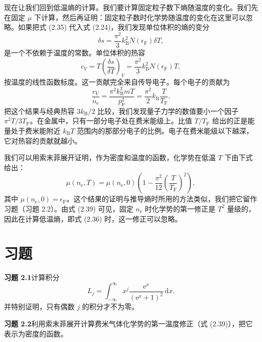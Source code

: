 现在让我们回到低温熵的计算。我们要计算固定粒子数下熵随温度的变化。我们先在固定 $\mu$ 下计算，然后再证明：固定粒子数时化学势随温度的变化在这里可以忽略。如果把式 (2.35) 代入式 (2.24)，我们发现单位体积的熵的变分
\begin{equation*}
\delta s=\frac{\pi^{2}}{3}k_{\mathrm{B}}^{2}N(\epsilon_{\mathrm{F}})\delta T,
\tag{2.36}
\end{equation*}
是一个不依赖于温度的常数。单位体积的热容
\begin{equation*}
c_{V}=T\left(\frac{\delta s}{\delta T}\right)_{V}=\frac{\pi^{2}}{3}k_{\mathrm{B}}^{2}N(\epsilon_{\mathrm{F}})T,
\tag{2.37}
\end{equation*}
按温度的线性函数标度。这一贡献完全来自传导电子。每个电子的贡献为
\begin{equation*}
\frac{c_{V}}{n_{\mathrm{e}}}=\frac{\pi^{2}k_{\mathrm{B}}^{2}mT}{p_{\mathrm{F}}^{2}}=\frac{\pi^{2}}{2}k_{\mathrm{B}}\frac{T}{T_{\mathrm{F}}}.
\tag{2.38}
\end{equation*}
把这个结果与经典热容 $3k_{\mathrm{B}}/2$ 比较，我们发现量子力学的数值要小一个因子 $\pi^{2}T/3T_{\mathrm{F}}$。在金属中，只有一部分电子处在费米能级上。比值 $T/T_{\mathrm{F}}$ 给出的正是能量处于费米能附近 $k_{\mathrm{B}}T$ 范围内的那部分电子的比例。电子在费米能级以下越深，它对热容的贡献就越小。

我们可以用索末菲展开证明，作为密度和温度的函数，化学势在低温 $T$ 下由下式给出：
\begin{equation*}
\mu(n_{\mathrm{e}},T)=\mu(n_{\mathrm{e}},0)\left(1-\frac{\pi^{2}}{12}\left(\frac{T}{T_{\mathrm{F}}}\right)^{2}\right),
\tag{2.39}
\end{equation*}
其中 $\mu(n_{\mathrm{e}},0)=\epsilon_{\mathrm{F}}$。这个结果的证明与推导熵时所用的方法类似，我们把它留作习题（习题 2.2）。由式 (2.39) 可见，固定 $n_{\mathrm{e}}$ 时化学势的第一修正是 $T^{2}$ 量级的，因此在计算低温熵，即式 (2.36) 时，这一修正可以忽略。

\section*{习题}

\textbf{习题 2.1}\quad 计算积分
\begin{equation*}
L_{j}=\int_{-\infty}^{\infty}x^{j}\frac{\mathrm{e}^{x}}{(\mathrm{e}^{x}+1)^{2}}\,\mathrm{d}x.
\end{equation*}
并特别证明，只有偶数 $j$ 的积分才不为零。

\textbf{习题 2.2}\quad 利用索末菲展开计算费米气体化学势的第一温度修正（式 (2.39)），把它表示为密度的函数。
